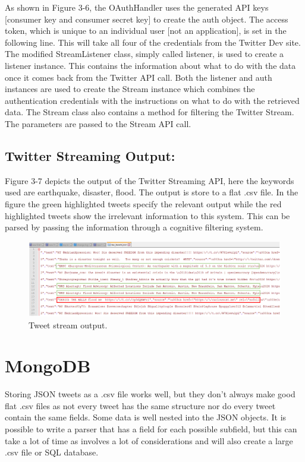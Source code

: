 As shown in Figure 3-6, the OAuthHandler uses the generated API keys [consumer key and consumer secret key] to create the auth object. The access token, which is unique to an individual user [not an application], is set in the following line. This will take all four of the credentials from the Twitter Dev site. The modified StreamListener class, simply called listener, is used to create a listener instance. This contains the information about what to do with the data once it comes back from the Twitter API call. Both the listener and auth instances are used to create the Stream instance which combines the authentication credentials with the instructions on what to do with the retrieved data. The Stream class also contains a method for filtering the Twitter Stream. The parameters are passed to the Stream API call.

\subsection{Twitter Streaming Output:}

Figure 3-7 depicts the output of the Twitter Streaming API, here the keywords used are earthquake, disaster, flood. The output is store to a flat .csv file. In the figure the green highlighted tweets specify the relevant output while the red highlighted tweets show the irrelevant information to this system. This can be parsed by passing the information through a cognitive filtering system.

\begin{figure}[ht!]
	\centering
	\includegraphics[width=153mm]{tweetoutput.png}
	\caption{Tweet stream output. \label{overflow}}
\end{figure}

\section{MongoDB}

Storing JSON tweets as a .csv file works well, but they don't always make good flat .csv files as not every tweet has the same structure nor do every tweet contain the same fields. Some data is well nested into the JSON objects. It is possible to write a parser that has a field for each possible subfield, but this can take a lot of time as involves a lot of considerations and will also create a large .csv file or SQL database.

